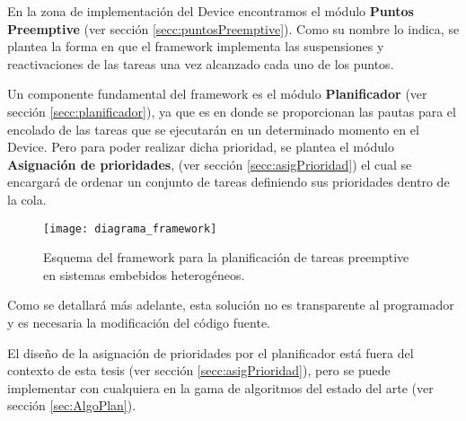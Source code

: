 En la zona de implementación del Device encontramos el módulo \textbf{Puntos Preemptive} (ver sección \ref{secc:puntosPreemptive}). Como su nombre lo indica, se plantea la forma en que el framework implementa las suspensiones y reactivaciones de las tareas una vez alcanzado cada uno de los puntos. 

Un componente fundamental del framework es el módulo \textbf{Planificador} (ver sección \ref{secc:planificador}), ya que es en donde se proporcionan las pautas para el encolado de las tareas que se ejecutarán en un determinado momento en el Device. Pero para poder realizar dicha prioridad, se plantea el módulo \textbf{Asignación de prioridades}, (ver sección \ref{secc:asigPrioridad}) el cual se encargará de ordenar un conjunto de tareas definiendo sus prioridades dentro de la cola.

  \begin{figure}[!]
        \texttt{[image: diagrama\_framework]}
        \caption{Esquema del framework para la planificación de tareas preemptive en sistemas embebidos heterogéneos.}
        \label{fig:diagramabase}
    \end{figure}

Como se detallará más adelante, esta solución no es transparente al programador y es necesaria la modificación del código fuente. 

El diseño de la asignación de prioridades por el planificador está fuera del contexto de esta tesis (ver sección \ref{secc:asigPrioridad}), pero se puede implementar con cualquiera en la gama de algoritmos del estado del arte (ver sección \ref{sec:AlgoPlan}).

